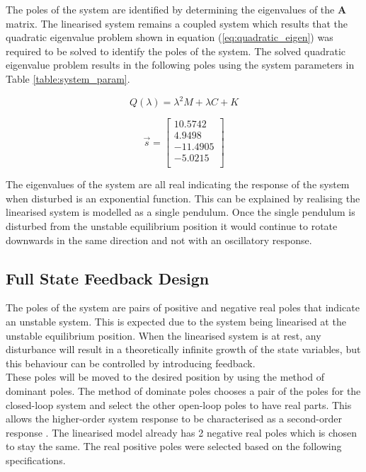 The poles of the system are identified by determining the eigenvalues of the $\boldsymbol{A}$ matrix. The linearised system remains a coupled system which results that the quadratic eigenvalue problem shown in equation (\ref{eq:quadratic_eigen}) was required to be solved to identify the poles of the system. The solved quadratic eigenvalue problem results in the following poles using the system parameters in Table \ref{table:system_param}.

\begin{equation} \label{eq:quadratic_eigen}
Q(\lambda) =\lambda^{2}M + \lambda C + K
\end{equation}

$$
\vec{s} = 
\begin{bmatrix}
10.5742 \\
4.9498	\\
-11.4905 \\
-5.0215 \\

\end{bmatrix}
$$

The eigenvalues of the system are all real indicating the response of the system when disturbed is an exponential function. This can be explained by realising the linearised system is modelled as a single pendulum. Once the single pendulum is disturbed from the unstable equilibrium position it would continue to rotate downwards in the same direction and not with an oscillatory response. 


\subsection{Full State Feedback Design}
The poles of the system are pairs of positive and negative real poles that indicate an unstable system. This is expected due to the system being linearised at the unstable equilibrium position. When the linearised system is at rest, any disturbance will result in a theoretically infinite growth of the state variables, but this behaviour can be controlled by introducing feedback. \\

These poles will be moved to the desired position by using the method of dominant poles. The method of dominate poles chooses a pair of the poles for the closed-loop system and select the other open-loop poles to have real parts. This allows the higher-order system response to be characterised as a second-order response \cite{textbook}. The linearised model already has 2 negative real poles which is chosen to stay the same. The real positive poles were selected based on the following specifications.\\

